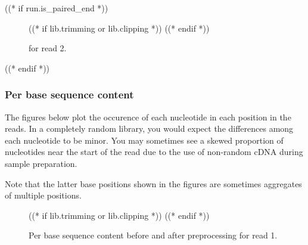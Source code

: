 ((* if run.is_paired_end *))
    \begin{figure}[h!]
        \centering
        \begin{minipage}[b]{0.48\textwidth}
            \centering
        \end{minipage}
        \begin{minipage}[b]{0.48\textwidth}
            \centering
            ((* if lib.trimming or lib.clipping *))
            ((* endif *))
        \end{minipage}
        \caption{\capSeqQ for read 2.}
    \end{figure}
((* endif *))

\subsubsection{Per base sequence content}
\newcommand{\capBaseC}{Per base sequence content before and after preprocessing }
    The figures below plot the occurence of each nucleotide in each position in
    the reads. In a completely random library, you would expect the differences
    among each nucleotide to be minor. You may sometimes see a skewed
    proportion of nucleotides near the start of the read due to the use of
    non-random cDNA during sample preparation.

    \indent

    Note that the latter base positions shown in the figures are
    sometimes aggregates of multiple positions.
    \begin{figure}[h!]
        \centering
        \begin{minipage}[b]{0.48\textwidth}
            \centering
        \end{minipage}
        \begin{minipage}[b]{0.48\textwidth}
            \centering
            ((* if lib.trimming or lib.clipping *))
            ((* endif *))
        \end{minipage}
        \caption{\capBaseC for read 1.}
    \end{figure}

